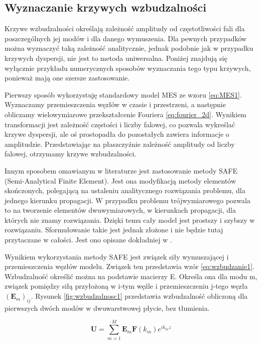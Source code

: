 

\subsection{Wyznaczanie krzywych wzbudzalności}

Krzywe wzbudzalności określają zależność amplitudy od częstotliwości fali dla poszczególnych jej modów i dla danego wymuszenia. Dla pewnych przypadków można wyznaczyć taką zależność analitycznie, jednak podobnie jak w przypadku krzywych dyspersji, nie jest to metoda uniwersalna. Poniżej znajdują się wyłącznie przykładu numerycznych sposobów wyznaczania tego typu krzywych, ponieważ mają one szersze zastosowanie.

Pierwszy sposób wykorzystuję standardowy model MES ze wzoru \ref{eq:MES1}. Wyznaczamy przemieszczenia węzłów w czasie i przestrzeni, a następnie obliczamy wielowymiarowe przekształcenie Fouriera \ref{eq:fourier_2d}. Wynikiem transformacji jest zależność częstości i liczby falowej, co pozwala wykreślać krzywe dyspersji, ale oś prostopadła do pozostałych zawiera informacje o amplitudzie. Przedstawiając na płaszczyźnie zależność amplitudy od liczby falowej, otrzymamy krzywe wzbudzalności.

Innym sposobem omawianym w literaturze jest zastosowanie metody SAFE (Semi-Analytical Finite Element). Jest ona modyfikacją metody elementów skończonych, polegającą na ustaleniu analitycznego rozwiązania problemu, dla jednego kierunku propagacji. W przypadku problemu trójwymiarowego pozwala to na tworzenie elementów dwuwymiarowych, w kierunkach propagacji, dla których nie znamy rozwiązania. Dzięki temu cały model jest prostszy i szybszy w rozwiązaniu. Sformułowanie takie jest jednak złożone i nie będzie tutaj przytaczane w całości. Jest ono opisane dokładniej w \cite{bartek_fabien}.

Wynikiem wykorzystania metody SAFE jest związek siły wymuszającej i przemieszczenia węzłów modelu. Związek ten przedstawia wzór \ref{eq:wzbudzanie1}. Wzbudzalność określić można na podstawie macierzy E. Określa ona dla modu m, związek pomiędzy siłą przyłożoną w i-tym węźle i przemieszczeniu j-tego węzła \( (\textbf{E}_m)_{ij} \). Rysunek \ref{fig:wzbudzalnosc1} przedstawia wzbudzalność obliczoną dla pierwszych dwóch modów w dwuwarstwowej płycie, bez tłumienia.

\begin{equation} \label{eq:wzbudzanie1}
\textbf{U} = \sum_{m=1}^M \textbf{E}_m \textbf{F}(k_m) e^{ik_m z}
\end{equation}


